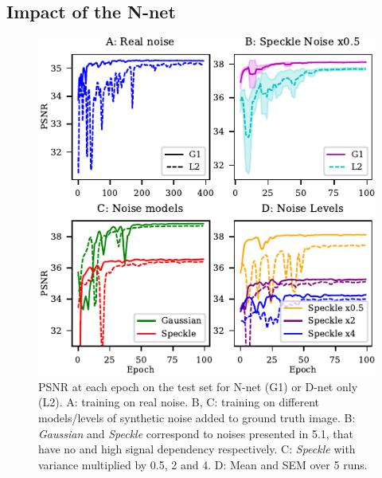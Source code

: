 \documentclass[lettersize,journal]{IEEEtran}
\begin{document}
\subsection{Impact of the N-net}
\label{si:impactnnet}
\begin{figure}[ht]
\begin{center}
\centerline{\includegraphics[width=\columnwidth]{fig_convergence.pdf}}
\caption{PSNR at each epoch on the test set for N-net (G1) or D-net only (L2). A: training on real noise. B, C: training on different models/levels of synthetic noise added to ground truth image. B: \textit{Gaussian} and \textit{Speckle} correspond to noises presented in 5.1, that have no and high signal dependency respectively. C: \textit{Speckle} with variance multiplied by 0.5, 2 and 4. D: Mean and SEM over 5 runs.}
\label{si:fig:convergence}
\end{center}
\end{figure}
\end{document}
